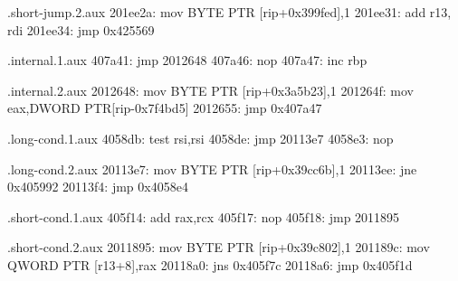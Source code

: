 \begin{filecontents*}{\jobname.short-jump.2.aux}
201ee2a: mov BYTE PTR [rip+0x399fed],1
201ee31: add r13, rdi
201ee34: jmp 0x425569
\end{filecontents*}

\begin{filecontents*}{\jobname.internal.1.aux}
407a41: jmp 2012648 
407a46: nop
407a47: inc rbp
\end{filecontents*}

\begin{filecontents*}{\jobname.internal.2.aux}
2012648: mov BYTE PTR [rip+0x3a5b23],1
201264f: mov eax,DWORD PTR[rip-0x7f4bd5]
2012655: jmp 0x407a47  
\end{filecontents*}


\begin{filecontents*}{\jobname.long-cond.1.aux}
4058db: test rsi,rsi
4058de: jmp  20113e7 
4058e3: nop    
\end{filecontents*}

\begin{filecontents*}{\jobname.long-cond.2.aux}
20113e7: mov BYTE PTR [rip+0x39cc6b],1
20113ee: jne 0x405992
20113f4: jmp 0x4058e4
\end{filecontents*}

\begin{filecontents*}{\jobname.short-cond.1.aux}
405f14: add rax,rcx
405f17: nop
405f18: jmp 2011895
\end{filecontents*}

\begin{filecontents*}{\jobname.short-cond.2.aux}
2011895: mov BYTE PTR [rip+0x39c802],1
201189c: mov QWORD PTR [r13+8],rax
20118a0: jns 0x405f7c
20118a6: jmp 0x405f1d
\end{filecontents*}


